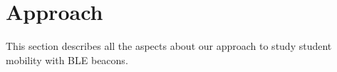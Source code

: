 \section{Approach}

This section describes all the aspects about our approach to study student mobility with BLE beacons.








